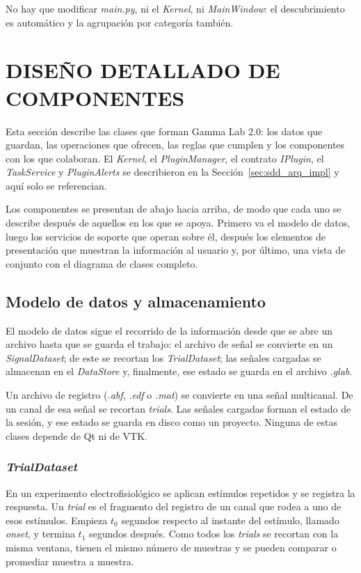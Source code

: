 \documentclass[12pt,letterpaper,oneside]{article}
\DeclareRobustCommand{\_}{\textunderscore\allowbreak}
\newcommand{\capitulo}[1]{\clearpage\section{#1}}
\begin{document}
No hay que modificar \textit{main.py}, ni el \textit{Kernel}, ni \textit{MainWindow}: el descubrimiento es automático y la agrupación por categoría también.


\capitulo{DISEÑO DETALLADO DE COMPONENTES}
\label{sec:sdd_componentes}

Esta sección describe las clases que forman Gamma Lab 2.0: los datos que guardan, las operaciones que ofrecen, las reglas que cumplen y los componentes con los que colaboran. El \textit{Kernel}, el \textit{PluginManager}, el contrato \textit{IPlugin}, el \textit{TaskService} y \textit{PluginAlerts} se describieron en la Sección~\ref{sec:sdd_arq_impl} y aquí solo se referencian.

Los componentes se presentan de abajo hacia arriba, de modo que cada uno se describe después de aquellos en los que se apoya. Primero va el modelo de datos, luego los servicios de soporte que operan sobre él, después los elementos de presentación que muestran la información al usuario y, por último, una vista de conjunto con el diagrama de clases completo.

\subsection{Modelo de datos y almacenamiento}
\label{sec:sdd_modelo}

El modelo de datos sigue el recorrido de la información desde que se abre un archivo hasta que se guarda el trabajo: el archivo de señal se convierte en un \textit{SignalDataset}; de este se recortan los \textit{TrialDataset}; las señales cargadas se almacenan en el \textit{DataStore} y, finalmente, ese estado se guarda en el archivo \textit{.glab}.

Un archivo de registro (\textit{.abf}, \textit{.edf} o \textit{.mat}) se convierte en una señal multicanal. De un canal de esa señal se recortan \textit{trials}. Las señales cargadas forman el estado de la sesión, y ese estado se guarda en disco como un proyecto. Ninguna de estas clases depende de Qt ni de VTK.

\subsubsection{\textit{TrialDataset}}
\label{sec:sdd_trialdataset}

En un experimento electrofisiológico se aplican estímulos repetidos y se registra la respuesta. Un \textit{trial} es el fragmento del registro de un canal que rodea a uno de esos estímulos. Empieza $t_0$ segundos respecto al instante del estímulo, llamado \textit{onset}, y termina $t_1$ segundos después. Como todos los \textit{trials} se recortan con la misma ventana, tienen el mismo número de muestras y se pueden comparar o promediar muestra a muestra.
\end{document}
